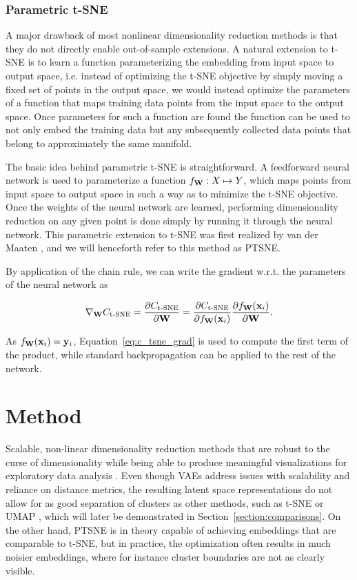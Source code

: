 \subsection{Parametric t-SNE}
\label{subsection:parametric_tsne}

A major drawback of most nonlinear dimensionality reduction methods is that they do not directly enable out-of-sample extensions. A natural extension to t-SNE is to learn a function parameterizing the embedding from input space to output space, i.e. instead of optimizing the t-SNE objective by simply moving a fixed set of points in the output space, we would instead optimize the parameters of a function that maps training data points from the input space to the output space. Once parameters for such a function are found the function can be used to not only embed the training data but any subsequently collected data points that belong to approximately the same manifold.

The basic idea behind parametric t-SNE is straightforward. A feedforward neural network is used to parameterize a function $f_{\mathbf{W}}: X \mapsto Y$, which maps points from input space to output space in such a way as to minimize the t-SNE objective. Once the weights of the neural network are learned, performing dimensionality reduction on any given point is done simply by running it through the neural network. This parametric extension to t-SNE was first realized by van der Maaten \cite{parametric_tsne}, and we will henceforth refer to this method as PTSNE.

By application of the chain rule, we can write the gradient w.r.t. the parameters of the neural network as

$$\nabla_{\mathbf{W}} C_{\text{t-SNE}} = \frac{\partial C_{\text{t-SNE}}}{\partial \mathbf{W}} = \frac{\partial C_{\text{t-SNE}}}{\partial f_{\mathbf{W}}(\mathbf{x}_i)} \frac{\partial f_{\mathbf{W}}(\mathbf{x}_i)}{\partial \mathbf{W}}.$$

As $f_{\mathbf{W}}(\mathbf{x}_i) = \mathbf{y}_i$, Equation~\ref{eq:c_tsne_grad} is used to compute the first term of the product, while standard backpropagation can be applied to the rest of the network.

\chapter{Method}
\label{ch:method}

Scalable, non-linear dimensionality reduction methods that are robust to the curse of dimensionality while being able to produce meaningful visualizations for exploratory data analysis . Even though VAEs address issues with scalability and reliance on distance metrics, the resulting latent space representations do not allow for as good separation of clusters as other methods, such as t-SNE or UMAP \cite{umap}, which will later be demonstrated in Section~\ref{section:comparisons}. On the other hand, PTSNE is in theory capable of achieving embeddings that are comparable to t-SNE, but in practice, the optimization often results in much noisier embeddings, where for instance cluster boundaries are not as clearly visible.

